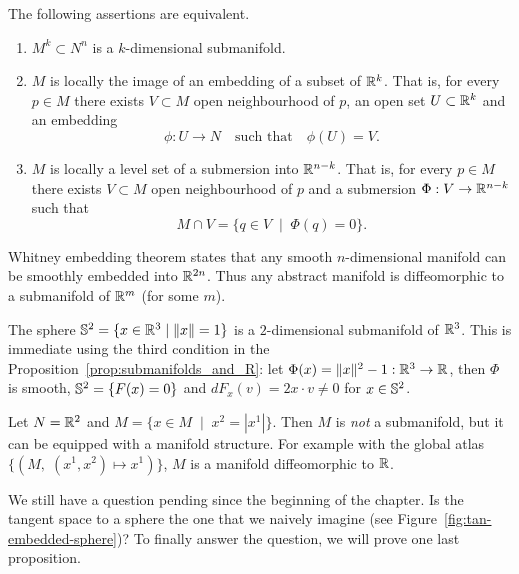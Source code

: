 \begin{proposition}\label{prop:submanifolds_and_R}
  The following assertions are equivalent.
  \begin{enumerate}
    \item $M^k\subset N^n$ is a $k$-dimensional submanifold.
    \item $M$ is locally the image of an embedding of a subset of $\mathbb{R}^k$. That is, for every $p\in M$ there exists $V\subset M$ open neighbourhood of $p$, an open set $U\subset\mathbb{R}^k$ and an embedding
    \begin{equation}
      \phi : U \to N \quad\mbox{such that}\quad \phi(U)=V.
    \end{equation}
    \item $M$ is locally a level set of a submersion into $\mathbb{R}^{n-k}$. That is, for every $p\in M$ there exists $V\subset M$ open neighbourhood of $p$ and a submersion $\Phi: V \to\mathbb{R}^{n-k}$ such that
    \begin{equation}
      M\cap V = \{q\in V \;\mid\; \Phi(q) = 0\}.
    \end{equation}
  \end{enumerate}
\end{proposition}

\begin{remark}
  Whitney embedding theorem states that any smooth $n$-dimensional manifold can be smoothly embedded into $\mathbb{R}^{2n}$.
  Thus any abstract manifold is diffeomorphic to a submanifold of $\mathbb{R}^m$ (for some $m$).
\end{remark}

\begin{example}\label{ex:s2}
  The sphere $\mathbb{S}^2 = \{x\in\mathbb{R}^3 \mid \|x\| = 1\}$ is a $2$-dimensional submanifold of $\mathbb{R}^3$.
  This is immediate using the third condition in the Proposition~\ref{prop:submanifolds_and_R}: let $\Phi(x) = \|x\|^2 -1 : \mathbb{R}^3 \to \mathbb{R}$, then $\Phi$ is smooth, $\mathbb{S}^2 = \{F(x)=0\}$ and $dF_x(v)= 2x\cdot v \neq 0$ for $x\in\mathbb{S}^2$.
\end{example}

\begin{example}
  Let $N = \mathbb{R}^2$ and $M = \{ x\in M \;\mid\; x^2 = |x^1| \}$.
  Then $M$ is \emph{not} a submanifold, but it can be equipped with a manifold structure.
  For example with the global atlas $\{(M,\; (x^1,x^2)\mapsto x^1)\}$, $M$ is a manifold diffeomorphic to $\mathbb{R}$.
\end{example}

We still have a question pending since the beginning of the chapter.
Is the tangent space to a sphere the one that we naively imagine (see Figure~\ref{fig:tan-embedded-sphere})?
To finally answer the question, we will prove one last proposition.

